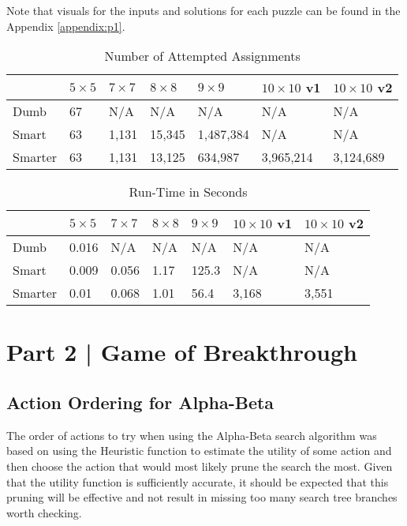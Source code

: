 \documentclass{article}[12pt]
\begin{document}
   Note that visuals for the inputs and solutions for each puzzle can be found in the Appendix \ref{appendix:p1}.
   
   \begin{table}[ht]
   \centering
   \begin{tabular}{l | l | l | l | l | l | l }
   \hline
    & $5 \times 5$ & $7 \times 7$& $8 \times 8$ & $9 \times 9$ & $10 \times 10$ v1& $10 \times 10$ v2\\
    \hline \hline 
   Dumb & 67 & N/A& N/A & N/A& N/A & N/A \\
   Smart & 63 & 1,131 & 15,345 & 1,487,384& N/A& N/A \\
   Smarter & 63 & 1,131 & 13,125 &634,987& 3,965,214& 3,124,689\\
   \hline
   \end{tabular}
   \caption{Number of Attempted Assignments} \label{tab:as1}
   \end{table}
   
   \begin{table}[ht]
   	\centering
   	\begin{tabular}{l | l | l | l | l | l | l }
   		\hline
   		& $5 \times 5$ & $7 \times 7$& $8 \times 8$ & $9 \times 9$ & $10 \times 10$ v1& $10 \times 10$ v2\\
   		\hline \hline 
   		Dumb & 0.016 & N/A& N/A & N/A& N/A & N/A \\
   		Smart & 0.009 & 0.056 & 1.17 & 125.3 & N/A& N/A \\
   		Smarter & 0.01 & 0.068 & 1.01 & 56.4 & 3,168& 3,551\\
   		\hline
   	\end{tabular}
   	\caption{Run-Time in Seconds } \label{tab:rt1}
   \end{table}
  
   
   
   \newpage
   \section{Part 2 | Game of Breakthrough}
   \subsection{Action Ordering for Alpha-Beta}
   The order of actions to try when using the Alpha-Beta search algorithm was based on using the Heuristic function to estimate the utility of some action and then choose the action that would most likely prune the search the most. Given that the utility function is sufficiently accurate, it should be expected that this pruning will be effective and not result in missing too many search tree branches worth checking.
   
\end{document}
